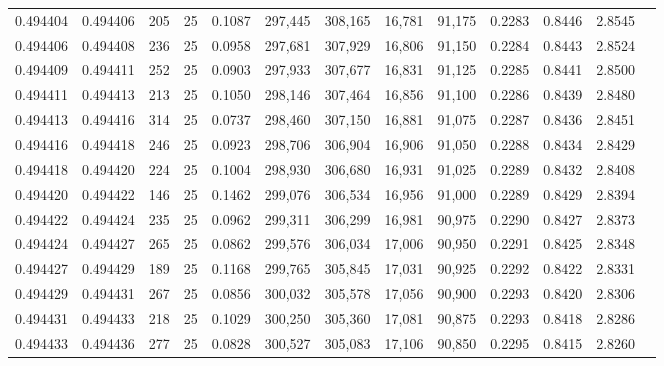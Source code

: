 \begin{tabular}{rrrrrrrrrrrrr}
0.494404 & 0.494406 &   205 &  25 &                                     0.1087 & 297,445 & 308,165 &  16,781 &  91,175 & 0.2283 & 0.8446 & 2.8545 \\
0.494406 & 0.494408 &   236 &  25 &                                     0.0958 & 297,681 & 307,929 &  16,806 &  91,150 & 0.2284 & 0.8443 & 2.8524 \\
0.494409 & 0.494411 &   252 &  25 &                                     0.0903 & 297,933 & 307,677 &  16,831 &  91,125 & 0.2285 & 0.8441 & 2.8500 \\
0.494411 & 0.494413 &   213 &  25 &                                     0.1050 & 298,146 & 307,464 &  16,856 &  91,100 & 0.2286 & 0.8439 & 2.8480 \\
0.494413 & 0.494416 &   314 &  25 &                                     0.0737 & 298,460 & 307,150 &  16,881 &  91,075 & 0.2287 & 0.8436 & 2.8451 \\
0.494416 & 0.494418 &   246 &  25 &                                     0.0923 & 298,706 & 306,904 &  16,906 &  91,050 & 0.2288 & 0.8434 & 2.8429 \\
0.494418 & 0.494420 &   224 &  25 &                                     0.1004 & 298,930 & 306,680 &  16,931 &  91,025 & 0.2289 & 0.8432 & 2.8408 \\
0.494420 & 0.494422 &   146 &  25 &                                     0.1462 & 299,076 & 306,534 &  16,956 &  91,000 & 0.2289 & 0.8429 & 2.8394 \\
0.494422 & 0.494424 &   235 &  25 &                                     0.0962 & 299,311 & 306,299 &  16,981 &  90,975 & 0.2290 & 0.8427 & 2.8373 \\
0.494424 & 0.494427 &   265 &  25 &                                     0.0862 & 299,576 & 306,034 &  17,006 &  90,950 & 0.2291 & 0.8425 & 2.8348 \\
0.494427 & 0.494429 &   189 &  25 &                                     0.1168 & 299,765 & 305,845 &  17,031 &  90,925 & 0.2292 & 0.8422 & 2.8331 \\
0.494429 & 0.494431 &   267 &  25 &                                     0.0856 & 300,032 & 305,578 &  17,056 &  90,900 & 0.2293 & 0.8420 & 2.8306 \\
0.494431 & 0.494433 &   218 &  25 &                                     0.1029 & 300,250 & 305,360 &  17,081 &  90,875 & 0.2293 & 0.8418 & 2.8286 \\
0.494433 & 0.494436 &   277 &  25 &                                     0.0828 & 300,527 & 305,083 &  17,106 &  90,850 & 0.2295 & 0.8415 & 2.8260 \\

\end{tabular}
